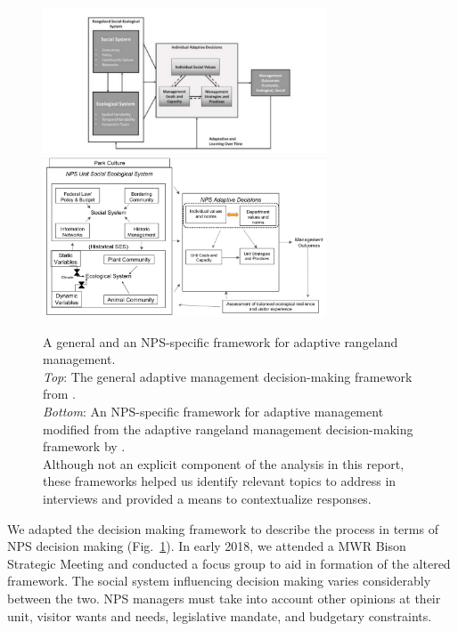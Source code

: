 \begin{figure}[t]
	\begin{minipage}{0.3\textwidth}
		\raggedright
		\caption[Adaptive management frameworks]
		{A general and an NPS-specific framework for adaptive rangeland management. \\
		\emph{Top}: The general adaptive management decision-making framework from \citet{lubell2013}. \\
		\emph{Bottom}: An NPS-specific framework for adaptive management modified from the adaptive rangeland management decision-making framework by \citet{lubell2013}. \\
		Although not an explicit component of the analysis in this report, these frameworks helped us identify relevant topics to address in interviews and provided a means to contextualize responses. } 
	\label{fig:frameworks}
	\end{minipage}
\begin{minipage}{0.8\textwidth}
	\centering
	\includegraphics[width=0.75\textwidth]
		{figures/LubellFramework.pdf}
	\includegraphics[width=0.75\textwidth]
		{figures/nps.png}
			\end{minipage}

\end{figure}


We adapted the decision making framework to describe the process in terms of NPS decision making (Fig.~\ref{fig:frameworks}).
In early 2018, we attended a MWR Bison Strategic Meeting and conducted a focus group to aid in formation of the altered framework. 
The social system influencing decision making varies considerably between the two. 
NPS managers must take into account other opinions at their unit, visitor wants and needs, legislative mandate, and budgetary constraints.

